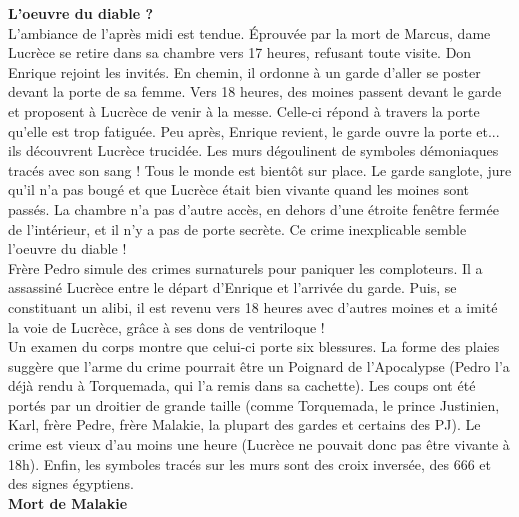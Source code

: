 \documentclass[11pt,twoside,a4paper]{book}
\begin{document}
\textbf{L'oeuvre du diable ?}~\\

L'ambiance de l'apr{\`e}s midi est tendue. {\'E}prouv{\'e}e par la mort de Marcus, dame Lucr{\`e}ce se retire dans sa chambre vers 17 heures, refusant toute visite. Don Enrique rejoint les invit{\'e}s. En chemin, il ordonne {\`a} un garde d'aller se poster devant la porte de sa femme. Vers 18 heures, des moines passent devant le garde et proposent {\`a} Lucr{\`e}ce de venir {\`a} la messe. Celle-ci r{\'e}pond {\`a} travers la porte qu'elle est trop fatigu{\'e}e. Peu apr{\`e}s, Enrique revient, le garde ouvre la porte et... ils d{\'e}couvrent Lucr{\`e}ce trucid{\'e}e. Les murs d{\'e}goulinent de symboles d{\'e}moniaques trac{\'e}s avec son sang ! Tous le monde est bient{\^o}t sur place. Le garde sanglote, jure qu'il n'a pas boug{\'e} et que Lucr{\`e}ce {\'e}tait bien vivante quand les moines sont pass{\'e}s. La chambre n'a pas d'autre acc{\`e}s, en dehors d'une {\'e}troite fen{\^e}tre ferm{\'e}e de l'int{\'e}rieur, et il n'y a pas de porte secr{\`e}te. Ce crime inexplicable semble l'oeuvre du diable !~\\

Fr{\`e}re Pedro simule des crimes surnaturels pour paniquer les comploteurs. Il a assassin{\'e} Lucr{\`e}ce entre le d{\'e}part d'Enrique et l'arriv{\'e}e du garde. Puis, se constituant un alibi, il est revenu vers 18 heures avec d'autres moines et a imit{\'e} la voie de Lucr{\`e}ce, gr{\^a}ce {\`a} ses dons de ventriloque !~\\

Un examen du corps montre que celui-ci porte six blessures. La forme des plaies sugg{\`e}re que l'arme du crime pourrait {\^e}tre un Poignard de l'Apocalypse (Pedro l'a d{\'e}j{\`a} rendu {\`a} Torquemada, qui l'a remis dans sa cachette). Les coups ont {\'e}t{\'e} port{\'e}s par un droitier de grande taille (comme Torquemada, le prince Justinien, Karl, fr{\`e}re Pedre, fr{\`e}re Malakie, la plupart des gardes et certains des PJ). Le crime est vieux d'au moins une heure (Lucr{\`e}ce ne pouvait donc pas {\^e}tre vivante {\`a} 18h). Enfin, les symboles trac{\'e}s sur les murs sont des croix invers{\'e}e, des 666 et des signes {\'e}gyptiens.~\\

\textbf{Mort de Malakie}~\\
\end{document}

